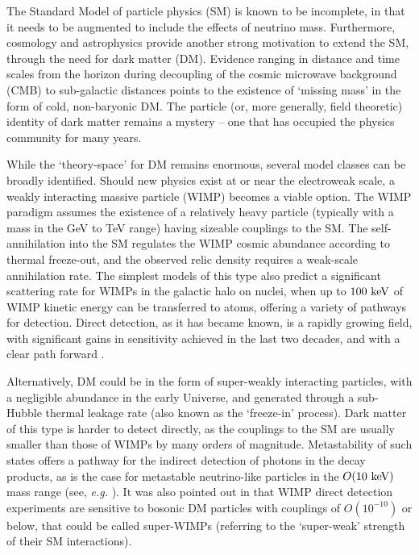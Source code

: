 \documentclass[prd,reprint,nofootinbib,notitlepage,aps,tightenlines,preprintnumbers,amsmath,amssymb,showpacs,superscriptaddress]{revtex4-1}
\begin{document}
The Standard Model of particle physics (SM) is known to be incomplete,
in that it needs to be augmented to include the effects of neutrino
mass. Furthermore, cosmology and astrophysics provide another strong
motivation to extend the SM, through the need for dark matter (DM).
Evidence ranging in distance and time scales from the horizon during
decoupling of the cosmic microwave background (CMB) to sub-galactic
distances points to the existence of `missing mass' in the form of cold,
non-baryonic DM. The particle (or, more generally, field theoretic)
identity of dark matter remains a mystery -- one that has occupied the
physics community for many years.

While the `theory-space' for DM remains enormous, several model
classes can be broadly identified.  Should new physics exist at or
near the electroweak scale, a weakly interacting massive particle
(WIMP) becomes a viable option. The WIMP paradigm assumes the
existence of a relatively heavy particle (typically with a mass in the
GeV to TeV range) having sizeable couplings to the SM.  The
self-annihilation into the SM regulates the WIMP cosmic abundance
according to thermal freeze-out, and the observed relic density
requires a weak-scale annihilation rate. The simplest models of this
type also predict a significant scattering rate for WIMPs in the
galactic halo on nuclei, when up to $100~{\rm keV}$ of WIMP kinetic
energy can be transferred to atoms, offering a variety of pathways for
detection. Direct detection, as it has became known, is a rapidly
growing field, with significant gains in sensitivity achieved in the
last two decades, and with a clear path forward
\cite{Cushman:2013zza}.

Alternatively, DM could be in the form of super-weakly interacting
particles, with a negligible abundance in the early Universe, and 
generated through a sub-Hubble thermal leakage rate (also known as
the `freeze-in' process). Dark matter of this type is harder to detect
directly, as the couplings to the SM are usually smaller than those of
WIMPs by many orders of magnitude. Metastability of such states offers
a pathway for the indirect detection of photons in the decay products,
as is the case for metastable neutrino-like particles in the
$O(10~\rm keV)$ mass range (see, {\em e.g.}
\cite{Abazajian:2006yn}). It was also pointed out in
\cite{Pospelov:2008jk} that WIMP direct detection experiments are
sensitive to bosonic DM particles with couplings of $O(10^{-10})$
or below, that could be called super-WIMPs (referring to the
`super-weak' strength of their SM interactions).
\end{document}
